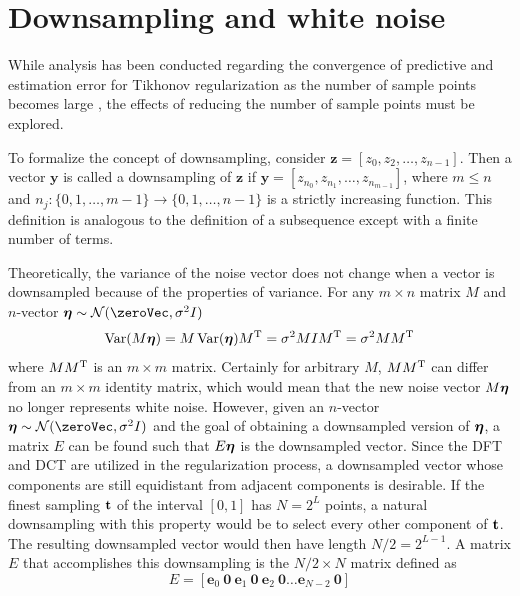 \section{Downsampling and white noise} \label{sec:Downsampling and white noise}
While analysis has been conducted regarding the convergence of predictive and estimation error for Tikhonov regularization as the number of sample points becomes large \cite[p.~109-126]{Vogel:2002}, the effects of reducing the number of sample points must be explored. \par  
To formalize the concept of downsampling, consider $\mathbf{z} = [z_0,z_2,\ldots,z_{n-1}]$. Then a vector $\mathbf{y}$ is called a downsampling of $\mathbf{z}$ if $\mathbf{y} = [z_{n_0},z_{n_1},\ldots,z_{n_{m-1}}]$, where $m \leq n$ and $n_j:\{0,1,\ldots,{m-1}\}\rightarrow\{0,1,\ldots,{n-1}\}$ is a strictly increasing function. This definition is analogous to the definition of a subsequence except with a finite number of terms. \par
Theoretically, the variance of the noise vector does not change when a vector is downsampled because of the properties of variance. For any $m\times n$ matrix $M$ and $n$-vector $\noiseVec \sim \mathcal{N}(\zeroVec,\noiseSD^2I)$
\begin{equation}
\operatorname{Var}(M\bm{\eta}) = M\operatorname{Var}(\bm{\eta})M^{\mathrm{T}} = \sigma^2MIM^{\mathrm{T}} = \sigma^2MM^{\mathrm{T}}
\label{eq:VarProp}
\end{equation}
where $MM^{\mathrm{T}}$ is an $m \times m$ matrix. Certainly for arbitrary $M$, $MM^{\mathrm{T}}$ can differ from an $m \times m$ identity matrix, which would mean that the new noise vector $M\bm{\eta}$ no longer represents white noise. However, given an $n$-vector $\noiseVec \sim \mathcal{N}(\zeroVec,\noiseSD^2I)$ and the goal of obtaining a downsampled version of $\bm{\eta}$, a matrix $E$ can be found such that $E\bm{\eta}$ is the downsampled vector. Since the DFT and DCT are utilized in the regularization process, a downsampled vector whose components are still equidistant from adjacent components is desirable. If the finest sampling $\mathbf{t}$ of the interval $[0,1]$ has $N = 2^L$ points, a natural downsampling with this property would be to select every other component of $\mathbf{t}$. The resulting downsampled vector would then have length $N/2 = 2^{L-1}$. A matrix $E$ that accomplishes this downsampling is the $N/2 \times N$ matrix defined as
\begin{equation}
E = [\mathbf{e}_0 \: \mathbf{0} \: \mathbf{e}_1 \: \mathbf{0} \: \mathbf{e}_2 \: \mathbf{0} \ldots \mathbf{e}_{N-2} \: \mathbf{0}]
\label{eq:Downsampling matrix}
\end{equation}
